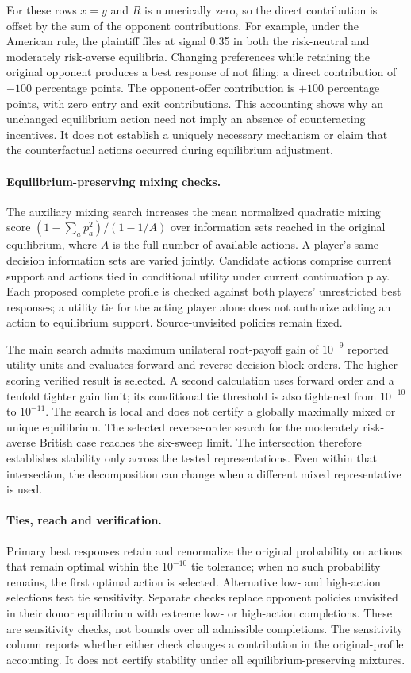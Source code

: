 For these rows $x=y$ and $R$ is numerically zero, so the direct contribution is
offset by the sum of the opponent contributions. For example, under the
American rule, the plaintiff files at signal 0.35 in both the risk-neutral and
moderately risk-averse equilibria. Changing preferences while retaining the
original opponent produces a best response of not filing: a direct contribution
of $-100$ percentage points. The opponent-offer contribution is $+100$
percentage points, with zero entry and exit contributions. This accounting
shows why an unchanged equilibrium action need not imply an absence of
counteracting incentives. It does not establish a uniquely necessary mechanism
or claim that the counterfactual actions occurred during equilibrium adjustment.

\paragraph{Equilibrium-preserving mixing checks.}
The auxiliary mixing search increases the mean normalized quadratic mixing
score $(1-\sum_a p_a^2)/(1-1/A)$ over information sets reached in the original
equilibrium, where $A$ is the full number of available actions. A player's
same-decision information sets are varied jointly. Candidate actions comprise
current support and actions tied in conditional utility under current
continuation play. Each proposed complete profile is checked against both
players' unrestricted best responses; a utility tie for the acting player alone
does not authorize adding an action to equilibrium support. Source-unvisited
policies remain fixed.

The main search admits maximum unilateral root-payoff gain of $10^{-9}$ reported
utility units and evaluates forward and reverse decision-block orders. The
higher-scoring verified result is selected. A second calculation uses forward
order and a tenfold tighter gain limit; its conditional tie threshold is also
tightened from $10^{-10}$ to $10^{-11}$. The search is local and does not certify
a globally maximally mixed or unique equilibrium. The selected reverse-order
search for the moderately risk-averse British case reaches the six-sweep limit.
The intersection therefore establishes stability only across the tested
representations. Even within that intersection, the decomposition can change
when a different mixed representative is used.

\paragraph{Ties, reach and verification.}
Primary best responses retain and renormalize the original probability on
actions that remain optimal within the $10^{-10}$ tie tolerance; when no such
probability remains, the first optimal action is selected. Alternative low- and
high-action selections test tie sensitivity. Separate checks replace opponent
policies unvisited in their donor equilibrium with extreme low- or high-action
completions. These are sensitivity checks, not bounds over all admissible
completions. The sensitivity column reports whether either check changes a
contribution in the original-profile accounting. It does not certify stability
under all equilibrium-preserving mixtures.

